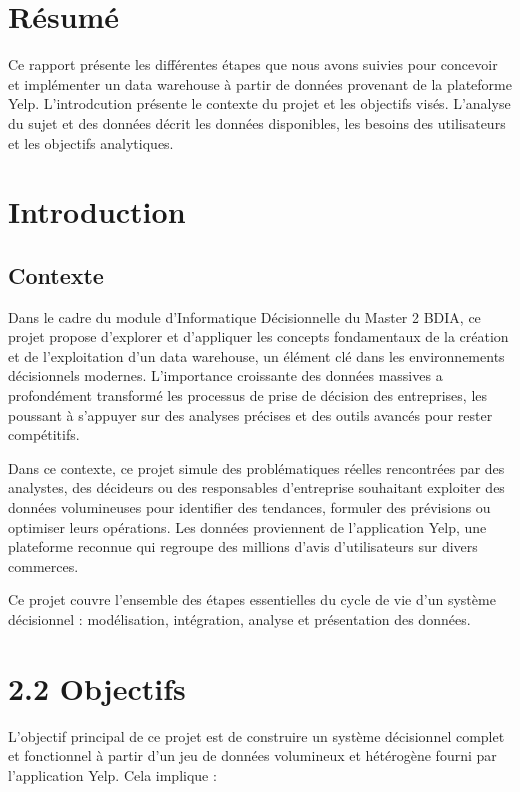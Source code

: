 \usepackage{graphicx}

\section*{Résumé}

Ce rapport présente les différentes étapes que nous avons suivies pour concevoir et implémenter un data warehouse à partir de données provenant de la plateforme Yelp.
L'introdcution présente le contexte du projet et les objectifs visés.
L'analyse du sujet et des données décrit les données disponibles, les besoins des utilisateurs et les objectifs analytiques.


\section*{Introduction}

\subsection{Contexte}\label{subsec:contexte}
Dans le cadre du module d’Informatique Décisionnelle du Master 2 BDIA, ce projet propose d’explorer et d’appliquer les concepts fondamentaux de la création et de l’exploitation d’un data warehouse, un élément clé dans les environnements décisionnels modernes. L’importance croissante des données massives a profondément transformé les processus de prise de décision des entreprises, les poussant à s’appuyer sur des analyses précises et des outils avancés pour rester compétitifs.

Dans ce contexte, ce projet simule des problématiques réelles rencontrées par des analystes, des décideurs ou des responsables d’entreprise souhaitant exploiter des données volumineuses pour identifier des tendances, formuler des prévisions ou optimiser leurs opérations. Les données proviennent de l’application Yelp, une plateforme reconnue qui regroupe des millions d’avis d’utilisateurs sur divers commerces. 

Ce projet couvre l’ensemble des étapes essentielles du cycle de vie d’un système décisionnel : modélisation, intégration, analyse et présentation des données. 


\section*{2.2 Objectifs}
L’objectif principal de ce projet est de construire un système décisionnel complet et fonctionnel à partir d’un jeu de données volumineux et hétérogène fourni par l’application Yelp. Cela implique :

